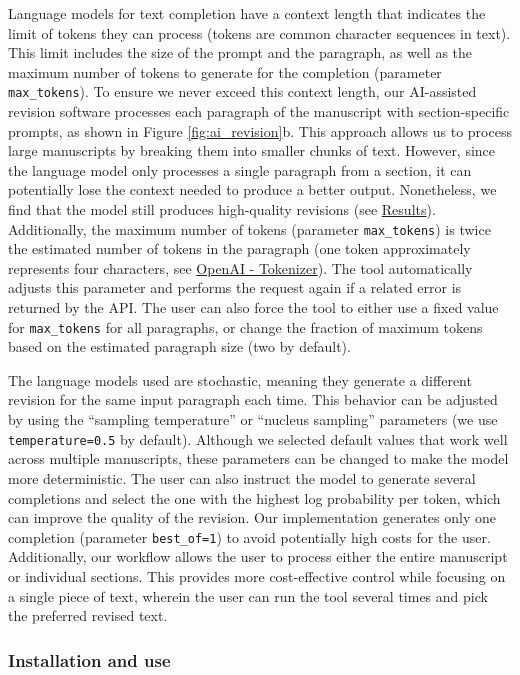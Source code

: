 \documentclass[
]{article}
\begin{document}
Language models for text completion have a context length that indicates the limit of tokens they can process (tokens are common character sequences in text).
This limit includes the size of the prompt and the paragraph, as well as the maximum number of tokens to generate for the completion (parameter \texttt{max\_tokens}).
To ensure we never exceed this context length, our AI-assisted revision software processes each paragraph of the manuscript with section-specific prompts, as shown in Figure \ref{fig:ai_revision}b.
This approach allows us to process large manuscripts by breaking them into smaller chunks of text.
However, since the language model only processes a single paragraph from a section, it can potentially lose the context needed to produce a better output.
Nonetheless, we find that the model still produces high-quality revisions (see \protect\hyperlink{sec:results}{Results}).
Additionally, the maximum number of tokens (parameter \texttt{max\_tokens}) is twice the estimated number of tokens in the paragraph (one token approximately represents four characters, see \href{https://platform.openai.com/tokenizer}{OpenAI - Tokenizer}).
The tool automatically adjusts this parameter and performs the request again if a related error is returned by the API.
The user can also force the tool to either use a fixed value for \texttt{max\_tokens} for all paragraphs, or change the fraction of maximum tokens based on the estimated paragraph size (two by default).

The language models used are stochastic, meaning they generate a different revision for the same input paragraph each time.
This behavior can be adjusted by using the ``sampling temperature'' or ``nucleus sampling'' parameters (we use \texttt{temperature=0.5} by default).
Although we selected default values that work well across multiple manuscripts, these parameters can be changed to make the model more deterministic.
The user can also instruct the model to generate several completions and select the one with the highest log probability per token, which can improve the quality of the revision.
Our implementation generates only one completion (parameter \texttt{best\_of=1}) to avoid potentially high costs for the user.
Additionally, our workflow allows the user to process either the entire manuscript or individual sections.
This provides more cost-effective control while focusing on a single piece of text, wherein the user can run the tool several times and pick the preferred revised text.

\subsubsection{Installation and use}
\end{document}
